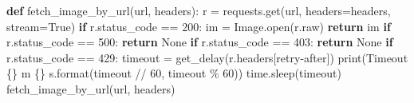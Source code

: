 \documentclass[
  letterpaper,
]{book}
\newenvironment{Shaded}{\begin{snugshade}}{\end{snugshade}}
\newcommand{\BuiltInTok}[1]{\textcolor[rgb]{0.00,0.23,0.31}{#1}}
\newcommand{\ControlFlowTok}[1]{\textcolor[rgb]{0.00,0.23,0.31}{\textbf{#1}}}
\newcommand{\DecValTok}[1]{\textcolor[rgb]{0.68,0.00,0.00}{#1}}
\newcommand{\KeywordTok}[1]{\textcolor[rgb]{0.00,0.23,0.31}{\textbf{#1}}}
\newcommand{\NormalTok}[1]{\textcolor[rgb]{0.00,0.23,0.31}{#1}}
\newcommand{\OperatorTok}[1]{\textcolor[rgb]{0.37,0.37,0.37}{#1}}
\newcommand{\SpecialCharTok}[1]{\textcolor[rgb]{0.37,0.37,0.37}{#1}}
\newcommand{\StringTok}[1]{\textcolor[rgb]{0.13,0.47,0.30}{#1}}
\newcommand{\VariableTok}[1]{\textcolor[rgb]{0.07,0.07,0.07}{#1}}
\begin{document}
\begin{Shaded}
\begin{Highlighting}[]
\KeywordTok{def}\NormalTok{ fetch\_image\_by\_url(url, headers):}
\NormalTok{    r }\OperatorTok{=}\NormalTok{ requests.get(url, headers}\OperatorTok{=}\NormalTok{headers, stream}\OperatorTok{=}\VariableTok{True}\NormalTok{)}
    \ControlFlowTok{if}\NormalTok{ r.status\_code }\OperatorTok{==} \DecValTok{200}\NormalTok{:}
\NormalTok{        im }\OperatorTok{=}\NormalTok{ Image.}\BuiltInTok{open}\NormalTok{(r.raw)}
        \ControlFlowTok{return}\NormalTok{ im}
    \ControlFlowTok{if}\NormalTok{ r.status\_code }\OperatorTok{==} \DecValTok{500}\NormalTok{:}
        \ControlFlowTok{return} \VariableTok{None}
    \ControlFlowTok{if}\NormalTok{ r.status\_code }\OperatorTok{==} \DecValTok{403}\NormalTok{:}
        \ControlFlowTok{return} \VariableTok{None}
    \ControlFlowTok{if}\NormalTok{ r.status\_code }\OperatorTok{==} \DecValTok{429}\NormalTok{:}
\NormalTok{        timeout }\OperatorTok{=}\NormalTok{ get\_delay(r.headers[}\StringTok{\textquotesingle{}retry{-}after\textquotesingle{}}\NormalTok{])}
        \BuiltInTok{print}\NormalTok{(}\StringTok{\textquotesingle{}Timeout }\SpecialCharTok{\{\}}\StringTok{ m }\SpecialCharTok{\{\}}\StringTok{ s\textquotesingle{}}\NormalTok{.}\BuiltInTok{format}\NormalTok{(timeout }\OperatorTok{//} \DecValTok{60}\NormalTok{, timeout }\OperatorTok{\%} \DecValTok{60}\NormalTok{))}
\NormalTok{        time.sleep(timeout)}
\NormalTok{        fetch\_image\_by\_url(url, headers)}


\end{Highlighting}
\end{Shaded}
\end{document}
